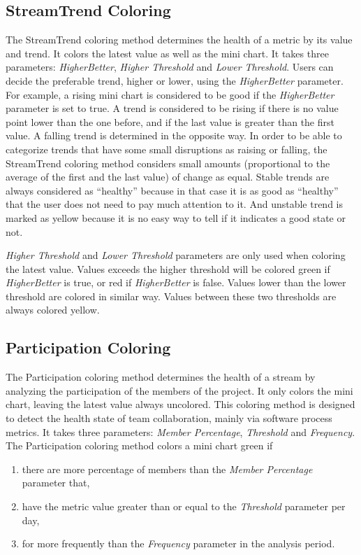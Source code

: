 \subsection{StreamTrend Coloring} 
\label{streamtrend}
The StreamTrend coloring method determines the health of a metric by its value and trend. It colors the latest value as well as the mini chart. It takes three parameters: {\it HigherBetter}, {\it Higher Threshold} and {\it Lower Threshold}. Users can decide the preferable trend, higher or lower, using the {\it HigherBetter} parameter. For example, a rising mini chart is considered to be good if the {\it HigherBetter} parameter is set to true. A trend is considered to be rising if there is no value point lower than the one before, and if the last value is greater than the first value. A falling trend is determined in the opposite way. In order to be able to categorize trends that have some small disruptions as raising or falling, the StreamTrend coloring method considers small amounts (proportional to the average of the first and the last value) of change as equal. Stable trends are always considered as ``healthy'' because in that case it is as good as ``healthy'' that the user does not need to pay much attention to it. And unstable trend is marked as yellow because it is no easy way to tell if it indicates a good state or not. 

{\it Higher Threshold} and {\it Lower Threshold} parameters are only used when coloring the latest value. Values exceeds the higher threshold will be colored green if {\it HigherBetter} is true, or red if {\it HigherBetter} is false. Values lower than the lower threshold are colored in similar way. Values between these two thresholds are always colored yellow.

\subsection{Participation Coloring}
\label{participation}
The Participation coloring method determines the health of a stream by analyzing the participation of the members of the project. It only colors the mini chart, leaving the latest value always uncolored. This coloring method is designed to detect the health state of team collaboration, mainly via software process metrics. It takes three parameters: {\it Member Percentage}, {\it Threshold} and {\it Frequency}. The Participation coloring method colors a mini chart green if 
\begin{enumerate}
\item there are more percentage of members than the {\it Member Percentage} parameter that,
\item have the metric value greater than or equal to the {\it Threshold} parameter per day,
\item for more frequently than the {\it Frequency} parameter in the analysis period.
\end{enumerate}

